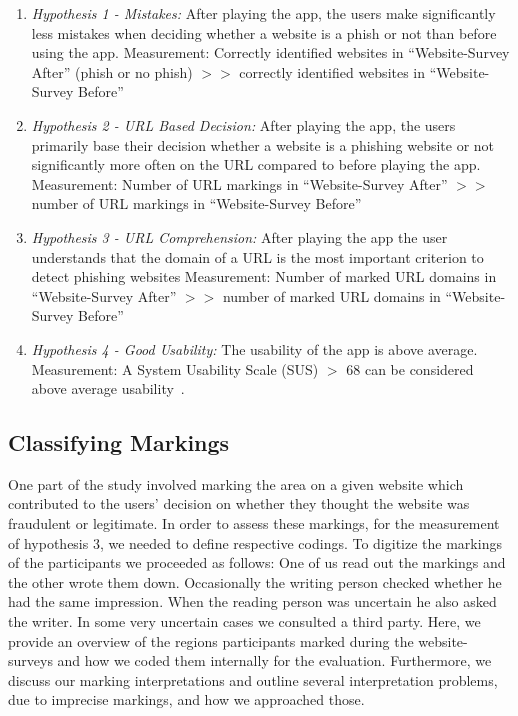 \begin{enumerate}
	\item \textit{Hypothesis 1 - Mistakes:} After playing the app, the users make significantly less mistakes when deciding whether a website is a phish or not than before using the app.\newline
	Measurement: Correctly identified websites in ``Website-Survey After'' (phish or no phish) $>>$ correctly identified websites in ``Website-Survey Before''
	\item \textit{Hypothesis 2 - URL Based Decision:} After playing the app, the users primarily base their decision whether a website is a phishing website or not significantly more often on the URL compared to before playing the app.\newline
	Measurement: Number of URL markings in ``Website-Survey After'' $>>$ number of URL markings in ``Website-Survey Before''
	\item \textit{Hypothesis 3 - URL Comprehension:} After playing the app the user understands that the domain of a URL is the most important criterion to detect phishing websites\newline
Measurement: Number of marked URL domains in ``Website-Survey After''  $>>$ number of marked URL domains in ``Website-Survey Before'' 
	\item \textit{Hypothesis 4 - Good Usability:} The usability of the app is above average. \newline
Measurement: A System Usability Scale (SUS) $>$ 68 can be considered above average usability~\cite{sus}.
\end{enumerate}

\subsection{Classifying Markings}
\label{s:markings}
One part of the study involved marking the area on a given website which contributed to the users' decision on whether they thought the website was fraudulent or legitimate.
In order to assess these markings, for the measurement of hypothesis 3, we needed to define respective codings.
To digitize the markings of the participants we proceeded as follows:
One of us read out the markings and the other wrote them down. Occasionally the writing person checked whether he had the same impression. When the reading person was uncertain he also asked the writer. In some very uncertain cases we consulted a third party.
Here, we provide an overview of the regions participants marked during the website-surveys and how we coded them internally for the evaluation.
Furthermore, we discuss our marking interpretations and outline several interpretation problems, due to imprecise markings, and how we approached those.

